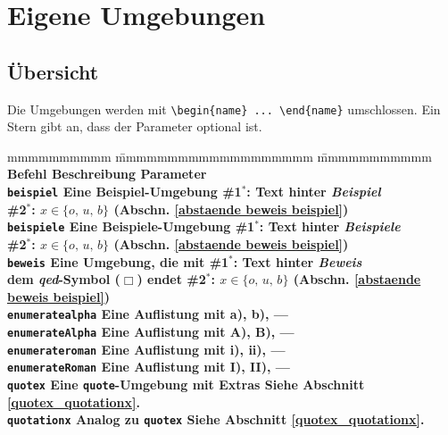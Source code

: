 

	\chapter{Eigene Umgebungen}
		\section{Übersicht}
			Die Umgebungen werden mit \verb|\begin{name} ... \end{name}| umschlossen. Ein Stern gibt an, dass der Parameter optional ist.
			\begin{tabbing}
				mmmmmmmmmm				\= mmmmmmmmmmmmmmmmmmm					\= mmmmmmmmmmm									\kill
				\bf Befehl				\> \bf Beschreibung						\> \bf Parameter 								\\
				\verb|beispiel|			\> Eine \textbf{Beispiel}-Umgebung 		\> \#1${}^*$: Text hinter \emph{Beispiel} 		\\
										\>										\> \#2${}^*$: $x \in \{o, \, u, \, b\}$ (Abschn. \ref{abstaende beweis beispiel}) \\	
				\verb|beispiele|		\> Eine \textbf{Beispiele}-Umgebung 	\> \#1${}^*$: Text hinter \emph{Beispiele} 	\\
										\>										\> \#2${}^*$: $x \in \{o, \, u, \, b\}$ (Abschn. \ref{abstaende beweis beispiel}) \\	
				\verb|beweis|			\> Eine Umgebung, die mit 				\> \#1${}^*$: Text hinter \emph{Beweis}		\\
										\> dem \emph{qed}-Symbol ($\Box$) endet	\> \#2${}^*$: $x \in \{o, \, u, \, b\}$ (Abschn. \ref{abstaende beweis beispiel})		\\
				\verb|enumeratealpha|	\> Eine Auflistung mit a), b), \ellipse	\> ---											\\
				\verb|enumerateAlpha|	\> Eine Auflistung mit A), B), \ellipse \> ---											\\
				\verb|enumerateroman|	\> Eine Auflistung mit i), ii), \ellipse\> ---											\\
				\verb|enumerateRoman|	\> Eine Auflistung mit I), II), \ellipse\> ---											\\
				\verb|quotex|			\> Eine \texttt{quote}-Umgebung mit Extras
																		\> Siehe Abschnitt \ref{quotex_quotationx}.			\\
				\verb|quotationx|		\>	Analog zu \texttt{quotex}	\> Siehe Abschnitt \ref{quotex_quotationx}.
			\end{tabbing}
			
